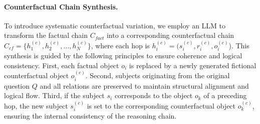 \documentclass[10pt, a4paper]{article}
\begin{document}
\begin{table}[t!]
\centering
{}
\caption{Performance comparison of LLMs across CRiT-QA and three standard multi-hop QA benchmarks.}
\label{tab:benchmark_results}
\end{table}


\paragraph{Counterfactual Chain Synthesis.} To introduce systematic counterfactual variation, we employ an LLM to transform the factual chain $C_{fact}$ into a corresponding counterfactual chain $C_{cf}=\{h^{(c)}_1, h^{(c)}_2, \ldots, h^{(c)}_N\}$, where each hop is $h^{(c)}_i=(s^{(c)}_i,r^{(c)}_i,o^{(c)}_i$). This synthesis is guided by the following principles to ensure coherence and logical consistency. First, each factual object $o_i$ is replaced by a newly generated fictional counterfactual object $o^{(c)}_i$. Second, subjects originating from the original question $Q$ and all relations are preserved to maintain structural alignment and logical flow. Third, if the subject $s_i$ corresponds to the object $o_k$ of a preceding hop, the new subject $s^{(c)}_i$ is set to the corresponding counterfactual object $o^{(c)}_k$, ensuring the internal consistency of the reasoning chain.
\end{document}
